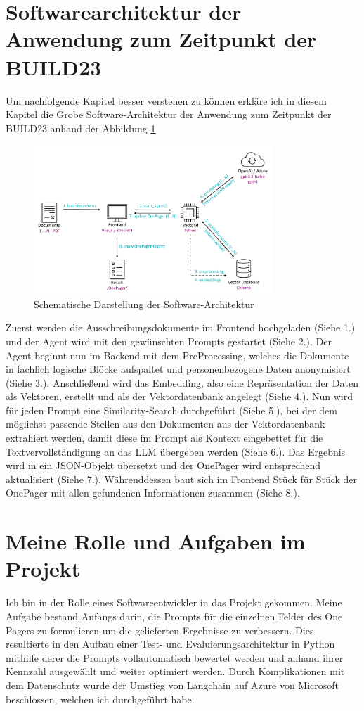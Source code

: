 \section{Softwarearchitektur der Anwendung zum Zeitpunkt der BUILD23}
Um nachfolgende Kapitel besser verstehen zu können erkläre ich in diesem Kapitel die Grobe Software-Architektur der
Anwendung zum Zeitpunkt der BUILD23 anhand der Abbildung \ref{fig:DokumentenAgent-uebersicht}.

\begin{figure}[h]
    \centering
    \includegraphics[width=0.8\textwidth]{figures/DokumentenAgent-Uebersicht.png}
    \caption{Schematische Darstellung der Software-Architektur}
    \label{fig:DokumentenAgent-uebersicht}    %
\end{figure}

Zuerst werden die Ausschreibungsdokumente im Frontend hochgeladen (Siehe 1.) und der Agent wird mit den gewünschten Prompts
gestartet (Siehe 2.). Der Agent beginnt nun im Backend mit dem PreProcessing, welches die Dokumente in fachlich logische Blöcke
aufspaltet und personenbezogene Daten anonymisiert (Siehe 3.). Anschließend wird das Embedding, also eine Repräsentation der Daten
als Vektoren, erstellt und als der Vektordatenbank angelegt (Siehe 4.). Nun wird für jeden Prompt eine Similarity-Search
durchgeführt (Siehe 5.), bei der dem möglichst passende Stellen aus den Dokumenten aus der Vektordatenbank extrahiert werden, damit
diese im Prompt als Kontext eingebettet für die Textvervollständigung an das LLM übergeben werden (Siehe 6.). Das Ergebnis wird in
ein JSON-Objekt übersetzt und der OnePager wird entsprechend aktualisiert (Siehe 7.). Währenddessen baut sich im Frontend Stück für
Stück der OnePager mit allen gefundenen Informationen zusammen (Siehe 8.).

\section{Meine Rolle und Aufgaben im Projekt}
Ich bin in der Rolle eines Softwareentwickler in das Projekt gekommen. Meine Aufgabe bestand Anfangs darin, die Prompts für die einzelnen 
Felder des One Pagers zu formulieren um die gelieferten Ergebnisse zu verbessern. Dies resultierte in den Aufbau einer 
Test- und Evaluierungsarchitektur in Python mithilfe derer die Prompts vollautomatisch bewertet werden und anhand ihrer Kennzahl 
ausgewählt und weiter optimiert werden. Durch Komplikationen mit dem Datenschutz wurde der Umstieg von Langchain auf 
Azure von Microsoft beschlossen, welchen ich durchgeführt habe. 

